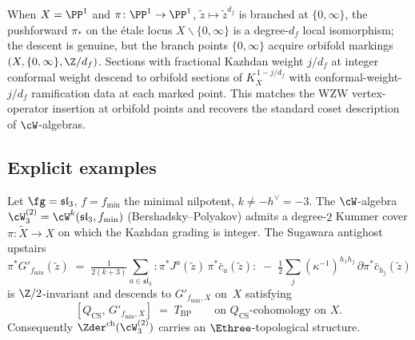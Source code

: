 \begin{remark}
\label{rem:orbifold-descent}
When $X = \PP^{1}$ and $\pi\colon \PP^{1} \to \PP^{1}$, $\tilde z
\mapsto \tilde z^{d_{f}}$ is branched at $\{0, \infty\}$, the
pushforward $\pi_{*}$ on the \'etale locus $X \smallsetminus \{0,
\infty\}$ is a degree-$d_{f}$ local isomorphism; the descent is
genuine, but the branch points $\{0, \infty\}$ acquire orbifold
markings $(X, \{0, \infty\}, \Z/d_{f})$. Sections with fractional
Kazhdan weight $j/d_{f}$ at integer conformal weight descend to
orbifold sections of $K_{X}^{\,1-j/d_{f}}$ with conformal-weight-
$j/d_{f}$ ramification data at each marked point. This matches the
WZW vertex-operator insertion at orbifold points and recovers the
standard coset description of $\cW$-algebras.
\end{remark}

\subsection{Explicit examples}
\label{subsec:fm81-explicit-examples}

\begin{theorem}
\label{thm:E3-topological-DS-general-explicit-BP}
Let $\fg = \mathfrak{sl}_{3}$, $f = f_{\min}$ the minimal nilpotent,
$k \ne -h^{\vee} = -3$. The $\cW$-algebra $\cW_{3}^{(2)} =
\cW^{k}(\mathfrak{sl}_{3}, f_{\min})$ \textup{(}Bershadsky--Polyakov\textup{)}
admits a degree-$2$ Kummer cover
$\pi\colon \widetilde X \to X$ on which the Kazhdan grading is
integer. The Sugawara antighost upstairs
\[
\pi^{*}G'_{f_{\min}}(\tilde z)
\;=\; \tfrac{1}{2(k+3)} \sum_{a \in \mathfrak{sl}_{3}}
 {:}\pi^{*}J^{a}(\tilde z)\, \pi^{*}\bar c_{a}(\tilde z){:}
\;-\; \tfrac{1}{2}\sum_{j}(\kappa^{-1})^{h_{1}h_{j}}\,
 \partial\pi^{*}\bar c_{h_{j}}(\tilde z)
\]
is $\Z/2$-invariant and descends to $G'_{f_{\min}, X}$ on~$X$
satisfying
\[
[Q_{\mathrm{CS}},\, G'_{f_{\min}, X}] \;=\; T_{\mathrm{BP}}
 \qquad \text{on $Q_{\mathrm{CS}}$-cohomology on~$X$.}
\]
Consequently $\Zder^{\mathrm{ch}}(\cW_{3}^{(2)})$ carries an
$\Ethree$-topological structure.
\end{theorem}

